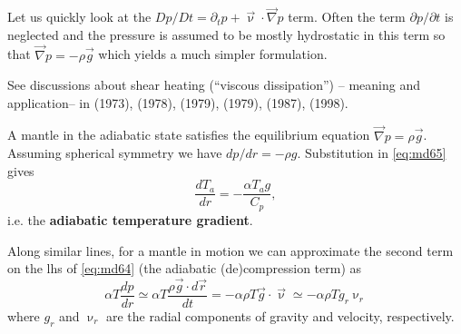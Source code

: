 Let us quickly look at the $Dp/Dt=\partial_t p + \vec\upnu\cdot\vec\nabla p$ term. 
Often the term $\partial p/\partial t$
is neglected and the pressure is assumed to be mostly hydrostatic in this term so 
that $\vec\nabla p = - \rho \vec{g}$ which yields a much simpler formulation. 

See discussions about shear heating (``viscous dissipation'') -- meaning and application-- in 
\textcite{froi73} (1973),
\textcite{stei78} (1978),
\textcite{biyu79} (1979),
\textcite{slsg79} (1979),
\textcite{wint87} (1987),
\textcite{madu98} (1998).

\vspace{1cm}

A mantle in the adiabatic state satisfies the equilibrium 
equation $\vec\nabla p = \rho \vec{g}$.
Assuming spherical symmetry we have $dp/dr=-\rho g$. Substitution 
in \eqref{eq:md65} gives
\begin{equation}
\frac{dT_a}{dr} = -\frac{\alpha T_a g}{C_p},
\label{eq:md66}
\end{equation}
i.e. the {\bf adiabatic temperature gradient}.

Along similar lines, for a mantle in motion we can approximate the second term on the
lhs of \eqref{eq:md64} (the adiabatic (de)compression term) as
\begin{equation}
\alpha T \frac{dp}{dr} \simeq \alpha T \frac{\rho \vec{g}\cdot d\vec{r}}{dt} 
= -\alpha \rho T \vec{g} \cdot \vec{\upnu}
\simeq -\alpha \rho T g_r \upnu_r 
\label{eq:md67}
\end{equation}
where $g_r$ and $\upnu_r$ are the radial
components of gravity and velocity, respectively.


\vspace{0.5cm}



